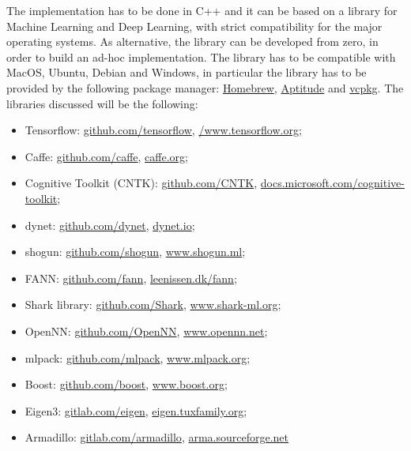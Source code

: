 The implementation has to be done in C++ and it can be based on a library for Machine Learning and Deep Learning, with strict compatibility for the major operating systems. As alternative, the library can be developed from zero, in order to build an ad-hoc implementation. The library has to be compatible with MacOS, Ubuntu, Debian and Windows, in particular the library has to be provided by the following package manager: \href{https://brew.sh}{Homebrew}, \href{https://wiki.debian.org/Aptitude}{Aptitude} and \href{https://docs.microsoft.com/it-it/cpp/build/vcpkg?view=msvc-160}{vcpkg}. The libraries discussed will be the following: 
\begin{itemize}
	\item Tensorflow: \href{https://github.com/tensorflow/tensorflow}{github.com/tensorflow}, \href{https://www.tensorflow.org}{/www.tensorflow.org};
	\item Caffe: \href{https://github.com/BVLC/caffe}{github.com/caffe}, \href{http://caffe.berkeleyvision.org}{caffe.org};
	\item Cognitive Toolkit (CNTK): \href{https://github.com/microsoft/CNTK}{github.com/CNTK}, \href{https://docs.microsoft.com/it-it/cognitive-toolkit/}{docs.microsoft.com/cognitive-toolkit};
	\item dynet: \href{https://github.com/clab/dynet}{github.com/dynet}, \href{http://dynet.io}{dynet.io};
	\item shogun: \href{https://github.com/shogun-toolbox/shogun}{github.com/shogun}, \href{https://www.shogun.ml}{www.shogun.ml};
	\item FANN: \href{https://github.com/libfann/fann}{github.com/fann}, \href{http://leenissen.dk/fann/wp/}{leenissen.dk/fann};
	\item Shark library: \href{https://github.com/Shark-ML/Shark}{github.com/Shark}, \href{http://www.shark-ml.org}{www.shark-ml.org};
	\item OpenNN: \href{https://github.com/Artelnics/OpenNN}{github.com/OpenNN}, \href{https://www.opennn.net}{www.opennn.net};
	\item mlpack: \href{https://github.com/mlpack/mlpack}{github.com/mlpack}, \href{https://www.mlpack.org}{www.mlpack.org};
	\item Boost: \href{https://github.com/boostorg/boost}{github.com/boost}, \href{https://www.boost.org}{www.boost.org};
	\item Eigen3: \href{https://gitlab.com/libeigen/eigen}{gitlab.com/eigen}, \href{https://eigen.tuxfamily.org/index.php?title=Main_Page}{eigen.tuxfamily.org};
	\item Armadillo: \href{https://gitlab.com/conradsnicta/armadillo-code}{gitlab.com/armadillo}, \href{http://arma.sourceforge.net}{arma.sourceforge.net}
\end{itemize}


